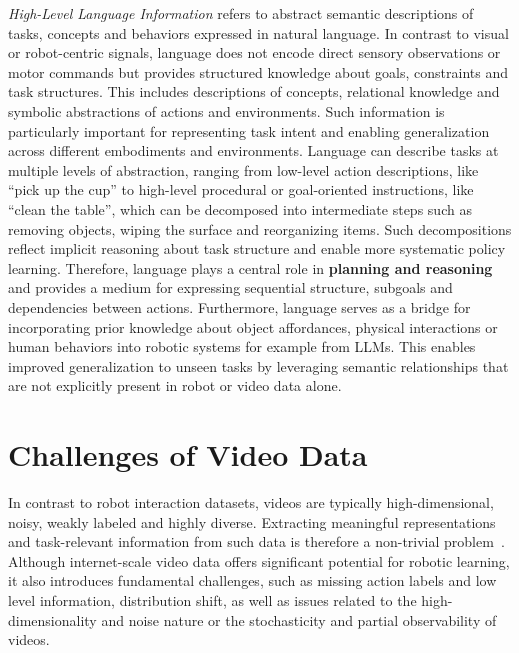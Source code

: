 \textit{High-Level Language Information}
refers to abstract semantic descriptions of tasks, concepts and behaviors expressed in natural language. In contrast to visual or robot-centric signals, language does not encode direct sensory observations or motor commands but provides structured knowledge about goals, constraints and task structures. This includes descriptions of concepts, relational knowledge and symbolic abstractions of actions and environments.
Such information is particularly important for representing task intent and enabling generalization across different embodiments and environments. Language can describe tasks at multiple levels of abstraction, ranging from low-level action descriptions, like ``pick up the cup'' to high-level procedural or goal-oriented instructions, like ``clean the table'', which can be decomposed into intermediate steps such as removing objects, wiping the surface and reorganizing items. Such decompositions reflect implicit reasoning about task structure and enable more systematic policy learning. Therefore, language plays a central role in \textbf{planning and reasoning} and provides a medium for expressing sequential structure, subgoals and dependencies between actions.
Furthermore, language serves as a bridge for incorporating prior knowledge about object affordances, physical interactions or human behaviors into robotic systems for example from \acp{LLM}. 
This enables improved generalization to unseen tasks by leveraging semantic relationships that are not explicitly present in robot or video data alone.




	
	

\section{Challenges of Video Data} \label{sec:ChallengesOfVideoData}






In contrast to robot interaction datasets, videos are typically high-dimensional, noisy, weakly labeled and highly diverse. Extracting meaningful representations and task-relevant information from such data is therefore a non-trivial problem~\cite{McCarthy_2025}. Although internet-scale video data offers significant potential for robotic learning, it also introduces fundamental challenges, such as missing action labels and low level information, distribution shift, as well as issues related to the high-dimensionality and noise nature or the stochasticity and partial observability of videos.




